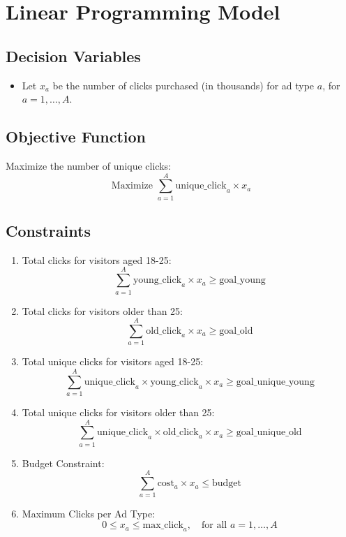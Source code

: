 \documentclass{article}
\begin{document}
\section*{Linear Programming Model}

\subsection*{Decision Variables}
\begin{itemize}
    \item Let \( x_a \) be the number of clicks purchased (in thousands) for ad type \( a \), for \( a = 1, \ldots, A \).
\end{itemize}

\subsection*{Objective Function}
Maximize the number of unique clicks:
\[
\text{Maximize } \sum_{a=1}^{A} \text{unique\_click}_{a} \times x_a
\]

\subsection*{Constraints}
\begin{enumerate}
    \item Total clicks for visitors aged 18-25:
    \[
    \sum_{a=1}^{A} \text{young\_click}_{a} \times x_a \geq \text{goal\_young}
    \]

    \item Total clicks for visitors older than 25:
    \[
    \sum_{a=1}^{A} \text{old\_click}_{a} \times x_a \geq \text{goal\_old}
    \]

    \item Total unique clicks for visitors aged 18-25:
    \[
    \sum_{a=1}^{A} \text{unique\_click}_{a} \times \text{young\_click}_{a} \times x_a \geq \text{goal\_unique\_young}
    \]

    \item Total unique clicks for visitors older than 25:
    \[
    \sum_{a=1}^{A} \text{unique\_click}_{a} \times \text{old\_click}_{a} \times x_a \geq \text{goal\_unique\_old}
    \]

    \item Budget Constraint:
    \[
    \sum_{a=1}^{A} \text{cost}_{a} \times x_a \leq \text{budget}
    \]

    \item Maximum Clicks per Ad Type:
    \[
    0 \leq x_a \leq \text{max\_click}_{a}, \quad \text{for all } a = 1, \ldots, A
    \]
\end{enumerate}
\end{document}
